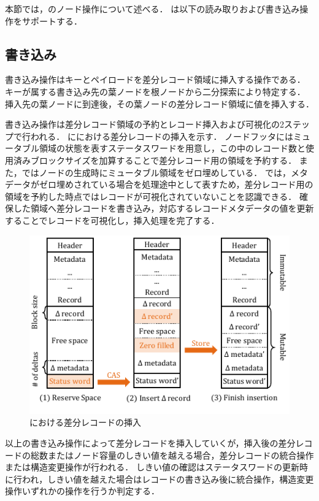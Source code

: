 本節では，\Bctree{}のノード操作について述べる．
\Bctree{}は以下の読み取りおよび書き込み操作をサポートする．

\subsection{書き込み}

書き込み操作はキーとペイロードを差分レコード領域に挿入する操作である．
キーが属する書き込み先の葉ノードを根ノードから二分探索により特定する．
挿入先の葉ノードに到達後，その葉ノードの差分レコード領域に値を挿入する．

書き込み操作は差分レコード領域の予約とレコード挿入および可視化の2ステップで行われる．
\Fig{\ref{fig:bc_tree_insertion}}に\Bctree{}における差分レコードの挿入を示す．
ノードフッタにはミュータブル領域の状態を表すステータスワードを用意し，この中のレコード数と使用済みブロックサイズを加算することで差分レコード用の領域を予約する．
また，\Bctree{}ではノードの生成時にミュータブル領域をゼロ埋めしている．
\Bctree{}では，メタデータがゼロ埋めされている場合を処理途中として表すため，差分レコード用の領域を予約した時点ではレコードが可視化されていないことを認識できる．
確保した領域へ差分レコードを書き込み，対応するレコードメタデータの値を更新することでレコードを可視化し，挿入処理を完了する．

\begin{figure}[t]
    \centering
    \includegraphics{./figures/Bc-insertion.pdf}
    \caption{\Bctree{}における差分レコードの挿入}
    \label{fig:bc_tree_insertion}
\end{figure}

以上の書き込み操作によって差分レコードを挿入していくが，挿入後の差分レコードの総数またはノード容量のしきい値を越える場合，差分レコードの統合操作または構造変更操作が行われる．
しきい値の確認はステータスワードの更新時に行われ，しきい値を越えた場合はレコードの書き込み後に統合操作，構造変更操作いずれかの操作を行うか判定する．

